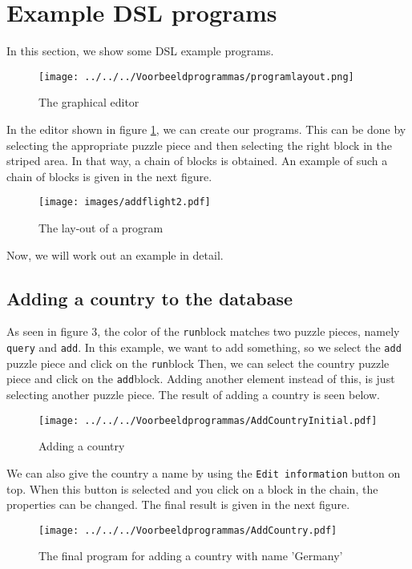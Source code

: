 
\section{Example DSL programs}
In this section, we show some DSL example programs. %

\begin{figure}[H]
	\centering
	\texttt{[image: ../../../Voorbeeldprogrammas/programlayout.png]}
	\caption{The graphical editor}
	\label{ex:DSLlayout}
\end{figure}
\noindent In the editor shown in figure \ref{ex:DSLlayout}, we can create our programs. This can be done by selecting the appropriate puzzle piece and then selecting the right block in the striped area. In that way, a chain of blocks is obtained. An example of such a chain of blocks is given in the next figure.
\begin{figure}[H]
	\centering
	\texttt{[image: images/addflight2.pdf]}
	\caption{The lay-out of a program}
	\label{ex:generalexample}
\end{figure}
Now, we will work out an example in detail.

\subsection{Adding a country to the database}
As seen in figure 3, the color of the \texttt{run}block matches two puzzle pieces, namely \texttt{query} and \texttt{add}.
In this example, we want to add something, so we select the \texttt{add} puzzle piece and click on the \texttt{run}block Then, we can select the country puzzle piece and click on the \texttt{add}block. Adding another element instead of this, is just selecting another puzzle piece. The result of adding a country is seen below.
\begin{figure}[H]
	\centering
	\texttt{[image: ../../../Voorbeeldprogrammas/AddCountryInitial.pdf]}
	\caption{Adding a country}
	\label{ex:addCountryInitial}
\end{figure}
\noindent We can also give the country a name by using the \texttt{Edit information} button on top. When this button is selected and you click on a block in the chain, the properties can be changed. The final result is given in the next figure.
\begin{figure}[H]
	\centering
	\texttt{[image: ../../../Voorbeeldprogrammas/AddCountry.pdf]}
	\caption{The final program for adding a country with name 'Germany'}
	\label{ex:addCountry}
\end{figure}


